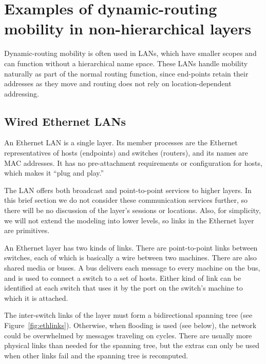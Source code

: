 \section{Examples of dynamic-routing mobility in non-hierarchical layers}
\label{sec:sec4}

Dynamic-routing mobility is often used in LANs, which have smaller
scopes and can function without a hierarchical name space.  
%
%
These LANs handle mobility naturally as part of the normal routing
function, since end-points retain their addresses as they move and
routing does not rely on location-dependent addressing.

\subsection{Wired Ethernet LANs}

An Ethernet LAN is a single layer.
Its member processes are the Ethernet representatives of hosts (endpoints)
and switches (routers),
and its names are MAC addresses.
It has no pre-attachment requirements or configuration for hosts,
which makes it ``plug and play.''

The LAN offers both broadcast and point-to-point services to
higher layers.
In this brief section we do not consider these communication services
further, so
there will be no discussion of the layer's sessions or locations.
Also, for simplicity, we will not extend the modeling into lower levels,
so links in the Ethernet layer are primitives.

An Ethernet layer has two kinds of links.
There are point-to-point links between 
switches, each of which is basically a wire
between two machines.
There are also shared media or buses.
A bus delivers each message
to every machine on the bus, and is used to connect a switch to a
set of hosts.
Either kind of link
can be identified at each switch that
uses it by the port on the switch's machine to which it is attached.

The inter-switch links of the layer must form a bidirectional
spanning tree (see Figure~\ref{fig:ethlinks}). 
Otherwise, when flooding is used (see below), 
the network could be overwhelmed by
messages traveling on cycles.
There are usually more physical links than needed for the spanning tree,
but the extras
can only be used when other links fail and the spanning tree
is recomputed.


